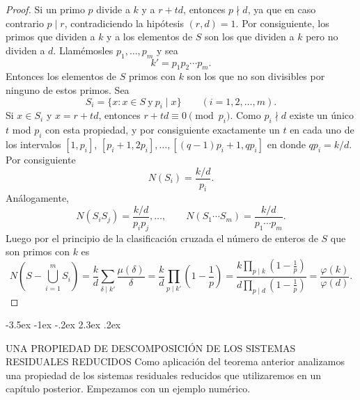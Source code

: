 \documentclass[12pt,a4paper]{book}
\makeatletter
\renewcommand\section{\@startsection{section}{1}{\z@}%
  {-3.5ex \@plus -1ex \@minus -.2ex}%
  {2.3ex \@plus .2ex}%
  {\normalfont\Large\bfseries\raggedright}}
\makeatother
\begin{document}
    \begin{proof}
        Si un primo $p$ divide a $k$ y a $r+td$, entonces $p\nmid d$, ya que en caso
        contrario $p\mid r$, contradiciendo la hipótesis $(r,d)=1$. Por consiguiente, los
        primos que dividen a $k$ y a los elementos de $S$ son los que dividen a $k$ pero
        no dividen a $d$. Llamémosles $p_{1},\dots,p_{m}$ y sea
        \begin{equation*}
            k'=p_{1}p_{2}\cdots p_{m}.
        \end{equation*}
        Entonces los elementos de $S$ primos con $k$ son los que no son divisibles por
        ninguno de estos primos. Sea
        \begin{equation*}
            S_{i}=\{x:x\in S\ \text{y}\ p_{i}\mid x\}\qquad(i=1,2,\dots,m).
        \end{equation*}
        Si $x\in S_{i}$ y $x=r+td$, entonces $r+td\equiv0\pmod{p_{i}}$. Como $p_{i}\nmid d$
        existe un único $t$ mod $p_{i}$ con esta propiedad, y por consiguiente exactamente
        un $t$ en cada uno de los intervalos $[1,p_{i}]$, $[p_{i}+1,2p_{i}],\dots,
        [(q-1)p_{i}+1,qp_{i}]$ en donde $qp_{i}=k/d$. Por consiguiente
        \begin{equation*}
            N(S_{i})=\frac{k/d}{p_{i}}.
        \end{equation*}
        Análogamente,
        \begin{equation*}
            N(S_{i}S_{j})=\frac{k/d}{p_{i}p_{j}},\dots,\qquad N(S_{1}\cdots S_{m})=\frac{k/d}{p_{1}\cdots p_{m}}.
        \end{equation*}
        Luego por el principio de la clasificación cruzada el número de enteros de $S$
        que son primos con $k$ es
        \begin{equation*}
            N\left(S-\bigcup_{i=1}^{m}S_{i}\right)=\frac{k}{d}\sum_{\delta\mid k'}
            \frac{\mu(\delta)}{\delta}=\frac{k}{d}\prod_{p\mid k'}\left(1-\frac{1}{p}\right)
            =\frac{k\displaystyle\prod_{p\mid k}\left(1-\frac{1}{p}\right)}
            {d\displaystyle\prod_{p\mid d}\left(1-\frac{1}{p}\right)}
            =\frac{\varphi(k)}{\varphi(d)}.
        \end{equation*}
    \end{proof}

    \section{UNA PROPIEDAD DE DESCOMPOSICIÓN DE LOS SISTEMAS RESIDUALES REDUCIDOS}
    Como aplicación del teorema anterior analizamos una propiedad de los sistemas
    residuales reducidos que utilizaremos en un capítulo posterior. Empezamos con un
    ejemplo numérico.
\end{document}
